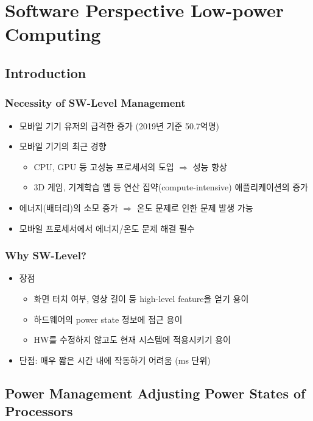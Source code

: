 \section{Software Perspective Low-power Computing}

\subsection{Introduction}

\subsubsection*{Necessity of SW-Level Management}
\begin{itemize}
    \item 모바일 기기 유저의 급격한 증가 (2019년 기준 50.7억명)
    \item 모바일 기기의 최근 경향
    \begin{itemize}
        \item CPU, GPU 등 고성능 프로세서의 도입 $\Rightarrow$ 성능 향상
        \item 3D 게임, 기계학습 앱 등 연산 집약(compute-intensive) 애플리케이션의 증가
    \end{itemize}
    \item 에너지(배터리)의 소모 증가 $\Rightarrow$ 온도 문제로 인한 문제 발생 가능
    \item 모바일 프로세서에서 에너지/온도 문제 해결 필수
\end{itemize}

\subsubsection*{Why SW-Level?}
\begin{itemize}
    \item 장점
    \begin{itemize}
        \item 화면 터치 여부, 영상 길이 등 high-level feature을 얻기 용이
        \item 하드웨어의 power state 정보에 접근 용이
        \item HW를 수정하지 않고도 현재 시스템에 적용시키기 용이
    \end{itemize}
    \item 단점: 매우 짧은 시간 내에 작동하기 어려움 (ms 단위)
\end{itemize}

\subsection{Power Management Adjusting Power States of Processors}

